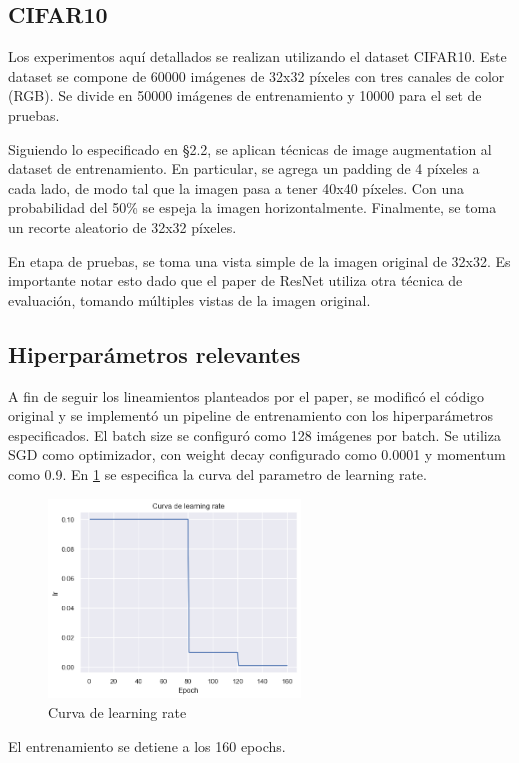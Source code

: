 \documentclass[titlepage,a4paper,oneside]{article}
\begin{document}
\subsection{CIFAR10}
Los experimentos aquí detallados se realizan utilizando el dataset CIFAR10. Este dataset se compone de 60000 imágenes de 32x32 píxeles con tres canales de color (RGB). Se divide en 50000 imágenes de entrenamiento y 10000 para el set de pruebas.

Siguiendo lo especificado en \S 2.2, se aplican técnicas de image augmentation al dataset de entrenamiento. En particular, se agrega un padding de 4 píxeles a cada lado, de modo tal que la imagen pasa a tener 40x40 píxeles. Con una probabilidad del 50\% se espeja la imagen horizontalmente. Finalmente, se toma un recorte aleatorio de 32x32 píxeles.

En etapa de pruebas, se toma una vista simple de la imagen original de 32x32. Es importante notar esto dado que el paper de ResNet utiliza otra técnica de evaluación, tomando múltiples vistas de la imagen original.

\subsection{Hiperparámetros relevantes}
A fin de seguir los lineamientos planteados por el paper, se modificó el código original y se implementó un pipeline de entrenamiento con los hiperparámetros especificados. El batch size se configuró como 128 imágenes por batch. Se utiliza SGD como optimizador, con weight decay  configurado como 0.0001 y momentum como 0.9. En \ref{lrcurve} se especifica la curva del parametro de learning rate.

\begin{figure}[H]
\centering
\includegraphics[height=200px]{images/lr_curve.png}
\caption{Curva de learning rate}
\label{lrcurve}
\end{figure}

El entrenamiento se detiene a los 160 epochs.
\end{document}
